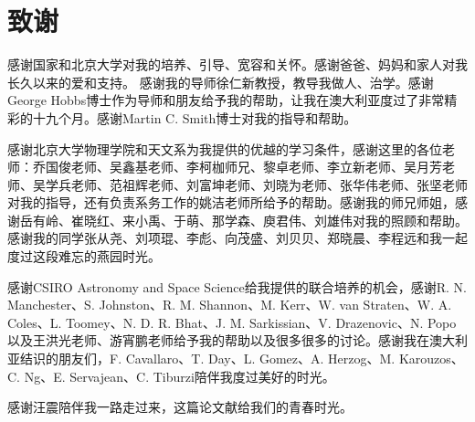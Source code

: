 
\chapter{致谢}

感谢国家和北京大学对我的培养、引导、宽容和关怀。感谢爸爸、妈妈和家人对我长久以来的爱和支持。
感谢我的导师徐仁新教授，教导我做人、治学。感谢George Hobbs博士作为导师和朋友给予我的帮助，让我在澳大利亚度过了非常精彩的十九个月。感谢Martin C. Smith博士对我的指导和帮助。

感谢北京大学物理学院和天文系为我提供的优越的学习条件，感谢这里的各位老师：乔国俊老师、吴鑫基老师、李柯枷师兄、黎卓老师、李立新老师、吴月芳老师、吴学兵老师、范祖辉老师、刘富坤老师、刘晓为老师、张华伟老师、张坚老师对我的指导，还有负责系务工作的姚洁老师所给予的帮助。感谢我的师兄师姐，感谢岳有岭、崔晓红、来小禹、于萌、那学森、庾君伟、刘雄伟对我的照顾和帮助。感谢我的同学张从尧、刘项琨、李彪、向茂盛、刘贝贝、郑晓晨、李程远和我一起度过这段难忘的燕园时光。

感谢CSIRO Astronomy and Space Science给我提供的联合培养的机会，感谢R. N. Manchester、S. Johnston、R. M. Shannon、M. Kerr、W. van Straten、W. A. Coles、L. Toomey、N. D. R. Bhat、J. M. Sarkissian、V. Drazenovic、N. Popo以及王洪光老师、游宵鹏老师给予我的帮助以及很多很多的讨论。感谢我在澳大利亚结识的朋友们，F. Cavallaro、T. Day、L. Gomez、A. Herzog、M. Karouzos、C. Ng、E. Servajean、C. Tiburzi陪伴我度过美好的时光。

感谢汪震陪伴我一路走过来，这篇论文献给我们的青春时光。
\pkuthssffaq

